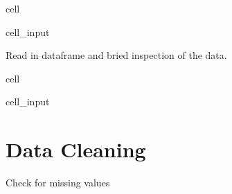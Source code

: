 \documentclass[letterpaper,10pt,english]{jupyterBook}
\begin{document}
\begin{sphinxuseclass}{cell}\begin{sphinxVerbatimInput}

\begin{sphinxuseclass}{cell_input}
\begin{sphinxVerbatim}[commandchars=\\\{\}]
    
\end{sphinxVerbatim}

\end{sphinxuseclass}\end{sphinxVerbatimInput}

\end{sphinxuseclass}
\sphinxAtStartPar
Read in dataframe and bried inspection of the data.

\begin{sphinxuseclass}{cell}\begin{sphinxVerbatimInput}

\begin{sphinxuseclass}{cell_input}
\begin{sphinxVerbatim}[commandchars=\\\{\}]
   
\end{sphinxVerbatim}

\end{sphinxuseclass}\end{sphinxVerbatimInput}

\end{sphinxuseclass}

\section{Data Cleaning}
\label{\detokenize{Initial_Data_Exploration:data-cleaning}}
\sphinxAtStartPar
Check for missing values
\end{document}
